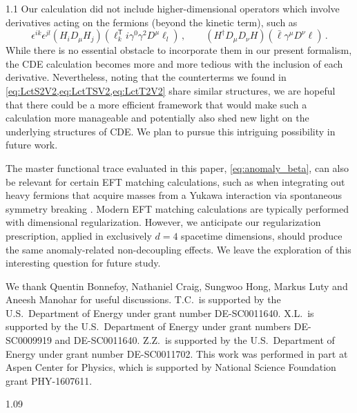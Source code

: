 \documentclass[a4paper,12pt]{article}
\def\T{\textsf{T}}
\begin{document}
\begin{spacing}{1.1}
Our calculation did not include higher-dimensional operators which involve derivatives acting on the fermions (beyond the kinetic term), such as
\begin{equation}
\epsilon^{ik} \epsilon^{jl} \left( H_i D_\mu H_j \right) \left( \ell_k^\T i\gamma^0\gamma^2 D^\mu \ell_l \right) \,,\qquad
\left( H^\dagger D_\mu D_\nu H \right) \left( \bar\ell \gamma^\mu D^\nu \ell \right) \,.
\end{equation}
While there is no essential obstacle to incorporate them in our present formalism, the CDE calculation becomes more and more tedious with the inclusion of each derivative. Nevertheless, noting that the counterterms we found in \cref{eq:LctS2V2,eq:LctTSV2,eq:LctT2V2} share similar structures, we are hopeful that there could be a more efficient framework that would make such a calculation more manageable and potentially also shed new light on the underlying structures of CDE. We plan to pursue this intriguing possibility in future work.

The master functional trace evaluated in this paper, \cref{eq:anomaly_beta}, can also be relevant for certain EFT matching calculations, such as when integrating out heavy fermions that acquire masses from a Yukawa interaction via spontaneous symmetry breaking \cite{DHoker:1984izu,DHoker:1984mif}. Modern EFT matching calculations are typically performed with dimensional regularization. However, we anticipate our regularization prescription, applied in exclusively $d=4$ spacetime dimensions, should produce the same anomaly-related non-decoupling effects. We leave the exploration of this interesting question for future study.



\acknowledgments
{}

We thank Quentin Bonnefoy, Nathaniel Craig, Sungwoo Hong, Markus Luty and Aneesh Manohar for useful discussions. T.C.\ is supported by the U.S.\ Department of Energy under grant number DE-SC0011640. X.L.\ is supported by the U.S.\ Department of Energy under grant numbers DE-SC0009919 and DE-SC0011640. Z.Z.\ is supported by the U.S.\ Department of Energy under grant number DE-SC0011702. This work was performed in part at Aspen Center for Physics, which is supported by National Science Foundation grant PHY-1607611.



\end{spacing}

\begin{spacing}{1.09}


\end{spacing}
\end{document}
